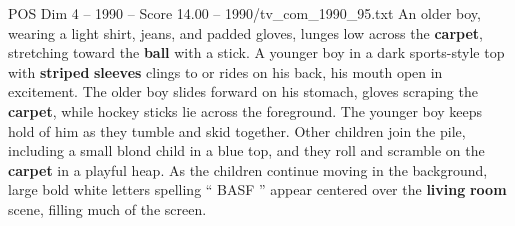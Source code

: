 \begin{textsample}{POS Dim 4 – 1990 – Score 14.00 – 1990/tv\_com\_1990\_95.txt}
An older boy, wearing a light shirt, jeans, and padded gloves, lunges low across the \textbf{carpet}, stretching toward the \textbf{ball} with a stick.
A younger boy in a dark sports-style top with \textbf{striped} \textbf{sleeves} clings to or rides on his back, his mouth open in excitement.
The older boy slides forward on his stomach, gloves scraping the \textbf{carpet}, while hockey sticks lie across the foreground.
The younger boy keeps hold of him as they tumble and skid together.
Other children join the pile, including a small blond child in a blue top, and they roll and scramble on the \textbf{carpet} in a playful heap.
As the children continue moving in the background, large bold white letters spelling “ BASF ” appear centered over the \textbf{living} \textbf{room} scene, filling much of the screen.

\end{textsample}
